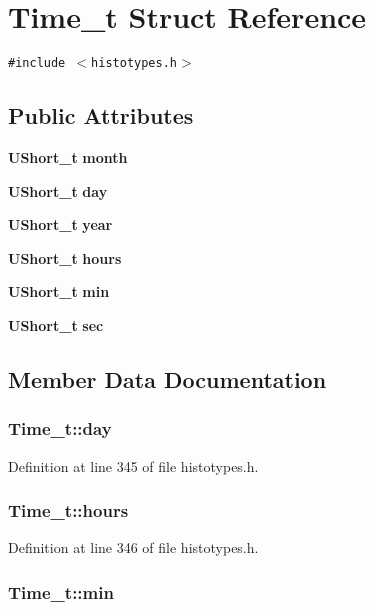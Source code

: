 \section{Time\_\-t  Struct Reference}
\label{structTime__t}
{\tt \#include $<$histotypes.h$>$}

\subsection*{Public Attributes}
\begin{CompactItemize}
\item 
{\bf UShort\_\-t} {\bf month}
\item 
{\bf UShort\_\-t} {\bf day}
\item 
{\bf UShort\_\-t} {\bf year}
\item 
{\bf UShort\_\-t} {\bf hours}
\item 
{\bf UShort\_\-t} {\bf min}
\item 
{\bf UShort\_\-t} {\bf sec}
\end{CompactItemize}


\subsection{Member Data Documentation}
\subsubsection{ Time\_\-t::day}\label{structTime__t_m1}




Definition at line 345 of file histotypes.h.
\subsubsection{ Time\_\-t::hours}\label{structTime__t_m3}




Definition at line 346 of file histotypes.h.
\subsubsection{ Time\_\-t::min}\label{structTime__t_m4}




